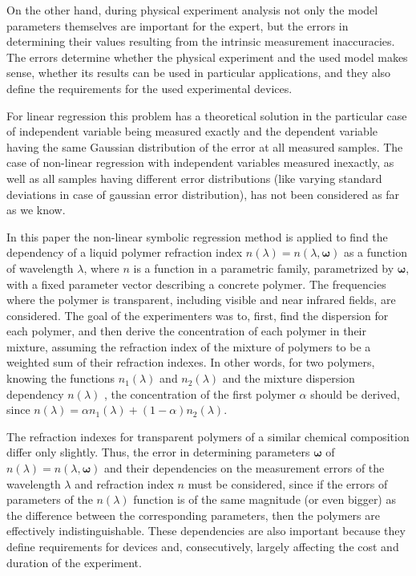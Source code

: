 \documentclass[11pt,a4paper]{article}
\theoremstyle{definition}
\begin{document}
On the other hand, during physical experiment analysis not only the model
parameters themselves are important for the expert, but the errors in
determining their values resulting from the intrinsic measurement inaccuracies.
The errors determine whether the physical experiment and the used model makes
sense, whether its results can be used in particular applications, and they also
define the requirements for the used experimental devices.

For linear regression this problem has a theoretical solution\cite{Vatunin05}
in the particular case of independent variable being measured exactly and the
dependent variable having the same Gaussian distribution of the error at all
measured samples. The case of non-linear regression with independent variables
measured inexactly, as well as all samples having
different error distributions (like varying standard deviations in case of gaussian
error distribution), has not been considered as far as we know.

In this paper the non-linear symbolic regression method is applied to find
the dependency of a liquid polymer refraction index $n(\lambda) = n(\lambda, \boldsymbol{\omega})$ as a function of
wavelength $\lambda$, where $n$ is a function in a parametric family,
parametrized by $\boldsymbol{\omega}$, with a fixed parameter vector
describing a concrete polymer. The frequencies where the polymer is
transparent, including visible and near infrared fields, are considered.
The goal of the
experimenters was to, first, find the dispersion for each polymer, and then
derive the concentration of each polymer in their mixture, assuming the
refraction index of the mixture of polymers to be a weighted sum of their refraction
indexes. In other words, for two polymers, knowing the functions
$n_1(\lambda)$ and $n_2(\lambda)$ and the mixture dispersion dependency $n(\lambda)$ ,
the concentration of the first polymer $\alpha$ should be derived, since
$n(\lambda) = \alpha n_1(\lambda) + (1 - \alpha) n_2(\lambda)$.

The refraction indexes for transparent polymers of a similar chemical
composition differ only slightly. Thus, the error in determining
parameters $\boldsymbol{\omega}$ of $n(\lambda) = n(\lambda, \boldsymbol{\omega})$
and their dependencies on the measurement errors
of the wavelength $\lambda$ and refraction index $n$ must be considered, since
if the errors of parameters of the $n(\lambda)$ function
is of the same magnitude (or even bigger) as the difference between the
corresponding parameters, then the polymers are effectively indistinguishable.
These dependencies are also important because they define requirements for 
devices and, consecutively, largely affecting the cost and duration of the
experiment.
\end{document}
